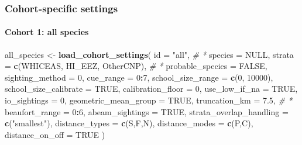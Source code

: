 \documentclass[
]{book}
\newenvironment{Shaded}{\begin{snugshade}}{\end{snugshade}}
\newcommand{\AttributeTok}[1]{\textcolor[rgb]{0.13,0.29,0.53}{#1}}
\newcommand{\CommentTok}[1]{\textcolor[rgb]{0.56,0.35,0.01}{\textit{#1}}}
\newcommand{\ConstantTok}[1]{\textcolor[rgb]{0.56,0.35,0.01}{#1}}
\newcommand{\DecValTok}[1]{\textcolor[rgb]{0.00,0.00,0.81}{#1}}
\newcommand{\FloatTok}[1]{\textcolor[rgb]{0.00,0.00,0.81}{#1}}
\newcommand{\FunctionTok}[1]{\textcolor[rgb]{0.13,0.29,0.53}{\textbf{#1}}}
\newcommand{\NormalTok}[1]{#1}
\newcommand{\OtherTok}[1]{\textcolor[rgb]{0.56,0.35,0.01}{#1}}
\newcommand{\SpecialCharTok}[1]{\textcolor[rgb]{0.81,0.36,0.00}{\textbf{#1}}}
\newcommand{\StringTok}[1]{\textcolor[rgb]{0.31,0.60,0.02}{#1}}
\begin{document}
\hypertarget{cohort-specific-settings-1}{%
\subsubsection*{Cohort-specific settings}\label{cohort-specific-settings-1}}

\hypertarget{cohort-1-all-species}{%
\paragraph*{Cohort 1: all species}\label{cohort-1-all-species}}

\begin{Shaded}
\begin{Highlighting}[]
\NormalTok{all\_species }\OtherTok{\textless{}{-}} \FunctionTok{load\_cohort\_settings}\NormalTok{(}
  \AttributeTok{id =} \StringTok{"all"}\NormalTok{, }\CommentTok{\# *}
  \AttributeTok{species =} \ConstantTok{NULL}\NormalTok{, }
  \AttributeTok{strata =} \FunctionTok{c}\NormalTok{(}\StringTok{\textquotesingle{}WHICEAS\textquotesingle{}}\NormalTok{, }\StringTok{\textquotesingle{}HI\_EEZ\textquotesingle{}}\NormalTok{, }\StringTok{\textquotesingle{}OtherCNP\textquotesingle{}}\NormalTok{), }\CommentTok{\# *}
  \AttributeTok{probable\_species =} \ConstantTok{FALSE}\NormalTok{,}
  \AttributeTok{sighting\_method =} \DecValTok{0}\NormalTok{,}
  \AttributeTok{cue\_range =} \DecValTok{0}\SpecialCharTok{:}\DecValTok{7}\NormalTok{,}
  \AttributeTok{school\_size\_range =} \FunctionTok{c}\NormalTok{(}\DecValTok{0}\NormalTok{, }\DecValTok{10000}\NormalTok{),}
  \AttributeTok{school\_size\_calibrate =} \ConstantTok{TRUE}\NormalTok{,}
  \AttributeTok{calibration\_floor =} \DecValTok{0}\NormalTok{,}
  \AttributeTok{use\_low\_if\_na =} \ConstantTok{TRUE}\NormalTok{,}
  \AttributeTok{io\_sightings =} \DecValTok{0}\NormalTok{,}
  \AttributeTok{geometric\_mean\_group =} \ConstantTok{TRUE}\NormalTok{,}
  \AttributeTok{truncation\_km =} \FloatTok{7.5}\NormalTok{, }\CommentTok{\# *}
  \AttributeTok{beaufort\_range =} \DecValTok{0}\SpecialCharTok{:}\DecValTok{6}\NormalTok{,}
  \AttributeTok{abeam\_sightings =} \ConstantTok{TRUE}\NormalTok{,}
  \AttributeTok{strata\_overlap\_handling =} \FunctionTok{c}\NormalTok{(}\StringTok{"smallest"}\NormalTok{),}
  \AttributeTok{distance\_types =} \FunctionTok{c}\NormalTok{(}\StringTok{\textquotesingle{}S\textquotesingle{}}\NormalTok{,}\StringTok{\textquotesingle{}F\textquotesingle{}}\NormalTok{,}\StringTok{\textquotesingle{}N\textquotesingle{}}\NormalTok{),}
  \AttributeTok{distance\_modes =} \FunctionTok{c}\NormalTok{(}\StringTok{\textquotesingle{}P\textquotesingle{}}\NormalTok{,}\StringTok{\textquotesingle{}C\textquotesingle{}}\NormalTok{),}
  \AttributeTok{distance\_on\_off =} \ConstantTok{TRUE}
\NormalTok{)}
\end{Highlighting}
\end{Shaded}
\end{document}
